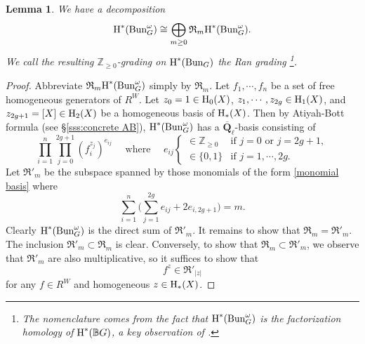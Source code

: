 \documentclass[reqno]{amsart}
\numberwithin{equation}{subsection}
\newtheorem{lemma}[subsubsection]{Lemma}
\theoremstyle{definition}
\def\BB{\mathbb{B}}
\def\ZZ{\mathbb{Z}}
\newcommand\frR{\mathfrak{R}}
\newcommand{\Bun}{\textup{Bun}}
\newcommand{\Qlbar}{\overline{\Q}_\ell}
\newcommand{\homog}[2]{\textup{H}_{#1}({#2})}  %
\newcommand{\cohog}[2]{\textup{H}^{#1}({#2})}     %
\newcommand{\om}{\omega}
\newcommand{\Q}{\mathbf{Q}}
\begin{document}
\begin{lemma}\label{l:Ran}
    We have a decomposition
    \begin{equation}\label{eq:cohog-ran-decomposition}
        \cohog{*}{\Bun_G^\om}\cong \bigoplus_{m\ge0}\frR_m\cohog{*}{\Bun_G^\om}.
    \end{equation}
    We call the resulting $\ZZ_{\ge0}$-grading on $\cohog{*}{\Bun_G}$ the {\em Ran grading} \footnote{The nomenclature comes from the fact that $\cohog{*}{\Bun^\om_G}$ is the factorization homology of $\cohog{*}{\BB G}$, a key observation of \cite{GL14}.}.
\end{lemma}
\begin{proof} 

    Abbreviate $\frR_m\cohog{*}{\Bun_G^\om}$ simply by $\frR_m$. Let $f_1,\cdots, f_n$ be a set of free homogeneous generators of $R^W$. Let $z_0=1 \in \homog{0}{X}$, $z_1,\cdots, z_{2g}\in\homog{1}{X}$, and $z_{2g+1}=[X]\in \homog{2}{X}$ be a homogeneous basis of $\homog{*}{X}$. Then by Atiyah-Bott formula (see \S\ref{sss:concrete AB}), $\cohog{*}{\Bun_G^\om}$ has a $\Qlbar$-basis consisting of
    \begin{equation}\label{monomial basis}
        \prod_{i=1}^n\prod_{j=0}^{2g+1} (f_i^{z_j})^{e_{ij}} \quad \text{ where } \quad 
        e_{ij} \begin{cases}
            \in \ZZ_{\ge0} & \mbox{if $j=0$ or $j=2g+1$},\\
            \in \{0,1\} & \mbox{if $j=1,\cdots,2g$}.
        \end{cases}
    \end{equation}
    Let $\frR'_m$ be the subspace spanned by those monomials of the form \eqref{monomial basis} where 
    \[
    \sum_{i=1}^n\Big( \sum_{j=1}^{2g} e_{ij} + 2e_{i,2g+1} \Big)=m.
    \]
    Clearly $\cohog{*}{\Bun_G^\om}$ is the direct sum of $\frR'_m$. It remains to show that $\frR_m=\frR'_m$. The inclusion $\frR'_m\subset \frR_m$ is clear. Conversely, to show that $\frR_m\subset \frR'_m$, we observe that $\frR'_m$ are also multiplicative, so it suffices to show that
    \begin{equation}\label{fz in R'}
        f^z\in \frR'_{|z|}
    \end{equation}
    for any $f\in R^W$ and homogeneous $z\in \homog{*}{X}$. 
    

\end{proof}
\end{document}

